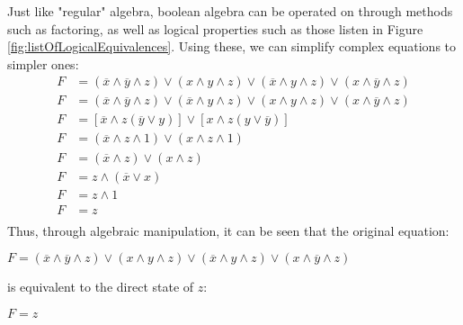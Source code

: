 \documentclass[12pt]{article}
\begin{document}
Just like "regular" algebra, boolean algebra can be operated on through methods such as factoring,
as well as logical properties such as those listen in Figure \ref{fig:listOfLogicalEquivalences}.
Using these, we can simplify complex equations to simpler ones:
\begin{align*}
  F &= (\overline{x} \land \overline{y} \land z) \lor (x \land y \land z) \lor (\overline{x} \land y \land z) \lor (x \land \overline{y} \land z) \\
  F &= (\overline{x} \land \overline{y} \land z) \lor (\overline{x} \land y \land z) \lor (x \land y \land z) \lor (x \land \overline{y} \land z) \\
  F &= [\overline{x} \land z(\overline{y} \lor y)] \lor [x \land z(y \lor \overline{y})] \\
  F &= (\overline{x} \land z \land 1) \lor (x \land z \land 1) \\
  F &= (\overline{x} \land z) \lor (x \land z) \\
  F &= z \land (\overline{x} \lor x) \\
  F &= z \land 1 \\
  F &= z \\
\end{align*}
Thus, through algebraic manipulation, it can be seen that the original equation:
\begin{center}
  $F = (\overline{x} \land \overline{y} \land z) \lor (x \land y \land z) \lor (\overline{x} \land y \land z) \lor (x \land \overline{y} \land z)$
\end{center}
is equivalent to the direct state of $z$:
\begin{center}
  $F = z$
\end{center}
\end{document}
